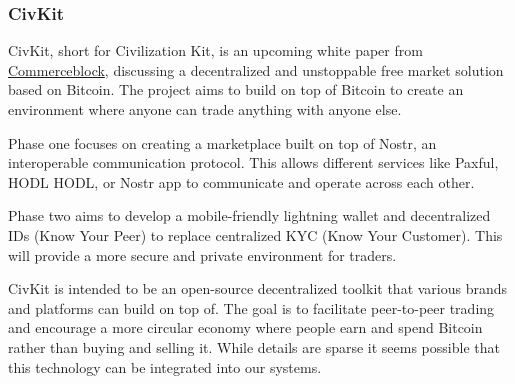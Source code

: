 \subsubsection{CivKit}
CivKit, short for Civilization Kit, is an upcoming white paper from \href{https://www.commerceblock.com/}{Commerceblock}, discussing a decentralized and unstoppable free market solution based on Bitcoin. The project aims to build on top of Bitcoin to create an environment where anyone can trade anything with anyone else. \par
Phase one focuses on creating a marketplace built on top of Nostr, an interoperable communication protocol. This allows different services like Paxful, HODL HODL, or Nostr app to communicate and operate across each other.\par
Phase two aims to develop a mobile-friendly lightning wallet and decentralized IDs (Know Your Peer) to replace centralized KYC (Know Your Customer). This will provide a more secure and private environment for traders.\par 
CivKit is intended to be an open-source decentralized toolkit that various brands and platforms can build on top of. The goal is to facilitate peer-to-peer trading and encourage a more circular economy where people earn and spend Bitcoin rather than buying and selling it. While details are sparse it seems possible that this technology can be integrated into our systems. 

%

